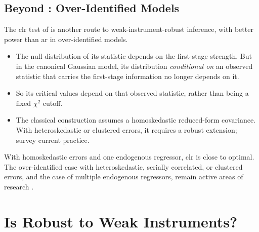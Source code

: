 \documentclass[a4paper,12pt]{article}
\begin{document}
\subsection{Beyond : Over-Identified Models}
The \gls{clr} test of \textcite{moreira-2003} is another route to weak-instrument-robust inference,
with better power than \gls{ar} in over-identified models.
\begin{itemize}
	\item The null distribution of its statistic depends on the first-stage strength.
	But in the canonical Gaussian model, its distribution \emph{conditional on} an observed statistic that carries the first-stage information no longer depends on it.
	\item So its critical values depend on that observed statistic, rather than being a fixed $\chi^2$ cutoff.
	\item The classical construction assumes a homoskedastic reduced-form covariance.
	With heteroskedastic or clustered errors, it requires a robust extension;
	\textcite{andrews-stock-sun-2019} survey current practice.
\end{itemize}
With homoskedastic errors and one endogenous regressor, \gls{clr} is close to optimal.
The over-identified case with heteroskedastic, serially correlated, or clustered errors,
and the case of multiple endogenous regressors, remain active areas of research \parencite{andrews-stock-sun-2019}.

\section{Is  Robust to Weak Instruments?}\label{sec-liml}
\end{document}
